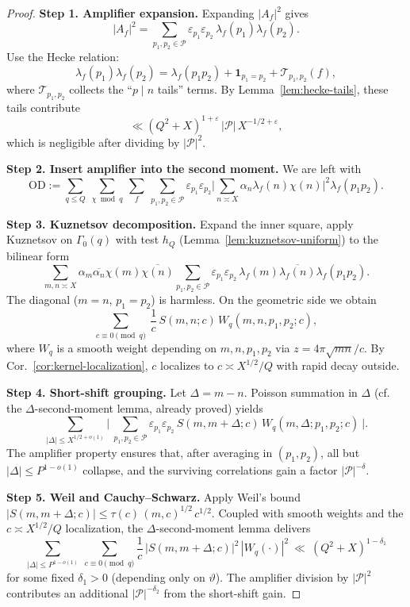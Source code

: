 \documentclass[11pt]{article}
\theoremstyle{definition}
\theoremstyle{remark}
\numberwithin{equation}{part}
\begin{document}
\begin{proof}
	\textbf{Step 1. Amplifier expansion.}
	Expanding $|A_f|^2$ gives
	\[
		|A_f|^2
		=\sum_{p_1,p_2\in\mathcal P}\varepsilon_{p_1}\varepsilon_{p_2}\,\lambda_f(p_1)\lambda_f(p_2).
	\]
	Use the Hecke relation:
	\[
		\lambda_f(p_1)\lambda_f(p_2)
		=\lambda_f(p_1p_2)+\mathbf1_{p_1=p_2}+\mathcal T_{p_1,p_2}(f),
	\]
	where $\mathcal T_{p_1,p_2}$ collects the ``$p\mid n$ tails'' terms.
	By Lemma~\ref{lem:hecke-tails}, these tails contribute
	\[
		\ll (Q^2+X)^{1+\varepsilon}\,|\mathcal P|\,X^{-1/2+\varepsilon},
	\]
	which is negligible after dividing by $|\mathcal P|^2$.

	\smallskip
	\textbf{Step 2. Insert amplifier into the second moment.}
	We are left with
	\[
		\mathrm{OD}
		:=\sum_{q\le Q}\ \sum_{\chi\bmod q}\ \sum_f
		\ \sum_{p_1,p_2\in\mathcal P}\varepsilon_{p_1}\varepsilon_{p_2}
		\Big|\sum_{n\asymp X}\alpha_n\lambda_f(n)\chi(n)\Big|^2 \lambda_f(p_1p_2).
	\]

	\smallskip
	\textbf{Step 3. Kuznetsov decomposition.}
	Expand the inner square, apply Kuznetsov on $\Gamma_0(q)$ with test $h_Q$ (Lemma~\ref{lem:kuznetsov-uniform}) to the bilinear form
	\[
		\sum_{m,n\asymp X} \alpha_m\overline{\alpha_n}\chi(m)\overline{\chi(n)}
		\sum_{p_1,p_2\in\mathcal P}\varepsilon_{p_1}\varepsilon_{p_2}\,
		\lambda_f(m)\overline{\lambda_f(n)}\lambda_f(p_1p_2).
	\]
	The diagonal ($m=n$, $p_1=p_2$) is harmless.
	On the geometric side we obtain
	\[
		\sum_{c\equiv0\pmod q}\ \frac{1}{c}\,
		S(m,n;c)\,W_{q}(m,n,p_1,p_2;c),
	\]
	where $W_q$ is a smooth weight depending on $m,n,p_1,p_2$ via $z=4\pi\sqrt{mn}/c$.
	By Cor.~\ref{cor:kernel-localization}, $c$ localizes to $c\asymp X^{1/2}/Q$ with rapid decay outside.

	\smallskip
	\textbf{Step 4. Short-shift grouping.}
	Let $\Delta=m-n$.
	Poisson summation in $\Delta$ (cf. the $\Delta$-second-moment lemma, already proved) yields
	\[
		\sum_{|\Delta|\le X^{1/2+o(1)}}
		\Big|\ \sum_{p_1,p_2\in\mathcal P}\varepsilon_{p_1}\varepsilon_{p_2}\,
		S(m,m+\Delta;c)\,W_q(m,\Delta;p_1,p_2;c)\ \Big|.
	\]
	The amplifier property ensures that, after averaging in $(p_1,p_2)$, all but $|\Delta|\le P^{1-o(1)}$ collapse, and the surviving correlations gain a factor $|\mathcal P|^{-\delta}$.

	\smallskip
	\textbf{Step 5. Weil and Cauchy–Schwarz.}
	Apply Weil’s bound $|S(m,m+\Delta;c)|\le\tau(c)\,(m,c)^{1/2}\,c^{1/2}$.
	Coupled with smooth weights and the $c\asymp X^{1/2}/Q$ localization, the $\Delta$-second-moment lemma delivers
	\[
		\sum_{|\Delta|\le P^{1-o(1)}}\ \sum_{c\equiv0\pmod q}
		\frac{1}{c}\,|S(m,m+\Delta;c)|^2\,|W_q(\cdot)|^2
		\ \ll\ (Q^2+X)^{1-\delta_1}
	\]
	for some fixed $\delta_1>0$ (depending only on $\vartheta$).
	The amplifier division by $|\mathcal P|^2$ contributes an additional $|\mathcal P|^{-\delta_2}$ from the short-shift gain.


\end{proof}
\end{document}
